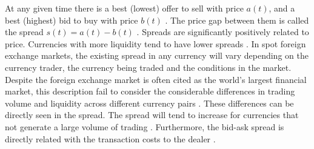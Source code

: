 At any given time there is a best (lowest) offer to sell with price
$a\left(t\right)$, and a best (highest) bid to buy with price $b\left(t\right)$
\cite{subtle_nature,book_forex,prop_order_book,account_spread,limit_ord_spread,stat_theory}.
The price gap between them is called the spread
$s\left(t\right) = a\left(t\right)-b\left(t\right)$
\cite{teach_spread,subtle_nature,Bouchaud_2004,book_forex,account_spread,stat_theory,large_prices_changes,market_digest,em_stylized_facts}.
Spreads are significantly positively related to price. Currencies with more
liquidity tend to have lower spreads
\cite{components_spread_tokyo,account_spread,effects_spread,components_spread}.
In spot foreign exchange markets, the existing spread in any currency will vary
depending on the currency trader, the currency being traded and the conditions
in the market. Despite the foreign exchange market is often cited as the
world's largest financial market, this description fail to consider the
considerable differences in trading volume and liquidity across different
currency pairs \cite{forex_microstructure,book_forex_2}. These differences can
be directly seen in the spread. The spread will tend to increase for currencies
that not generate a large volume of trading \cite{book_forex_2}. Furthermore,
the bid-ask spread is directly related with the transaction costs to the dealer
\cite{teach_spread,spread_futures,book_forex_2}.

